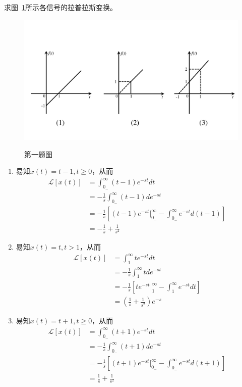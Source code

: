 \documentclass[answers]{exam}  %
\begin{document}
\Large
{}
\begin{questions}
	
	

\question 求图~\ref{Figure:question_1}所示各信号的拉普拉斯变换。
\begin{figure}[!h]
	\centering
	\includegraphics[width=\linewidth]{pics/question_1.pdf}
	\label{Figure:question_1}
	\caption{第一题图}
\end{figure}
\begin{solution}
\begin{enumerate}[(1)]
	\item 易知$x(t)=t-1,t\geq0$，从而\begin{align*}
		\mathcal{L}[x(t)]&=\int_{0_-}^{\infty}(t-1)e^{-st}dt\\
		&=-\frac{1}{s}\int_{0_-}^{\infty}(t-1)de^{-st}\\
		&=-\frac{1}{s}[(t-1)e^{-st}\big|_{0_-}^{\infty}-\int_{0_-}^{\infty}e^{-st}d(t-1)]\\
		&=-\frac{1}{s}+\frac{1}{s^2}
	\end{align*}
    \item 易知$x(t)=t,t>1$，从而\begin{align*}
    	\mathcal{L}[x(t)]&=\int_{1}^{\infty}te^{-st}dt\\
    	&=-\frac{1}{s}\int_{1}^{\infty}tde^{-st}\\
    	&=-\frac{1}{s}[te^{-st}\big|_{1}^{\infty}-\int_{1}^{\infty}e^{-st}dt]\\
    	&=(\frac{1}{s}+\frac{1}{s^2})e^{-s}
    \end{align*}
    \item 易知$x(t)=t+1,t\geq0$，从而\begin{align*}
    	\mathcal{L}[x(t)]&=\int_{0_-}^{\infty}(t+1)e^{-st}dt\\
    	&=-\frac{1}{s}\int_{0_-}^{\infty}(t+1)de^{-st}\\
    	&=-\frac{1}{s}[(t+1)e^{-st}\big|_{0_-}^{\infty}-\int_{0_-}^{\infty}e^{-st}d(t+1)]\\
    	&=\frac{1}{s}+\frac{1}{s^2}
    \end{align*}
\end{enumerate}
\end{solution}


\end{questions}
\end{document}
